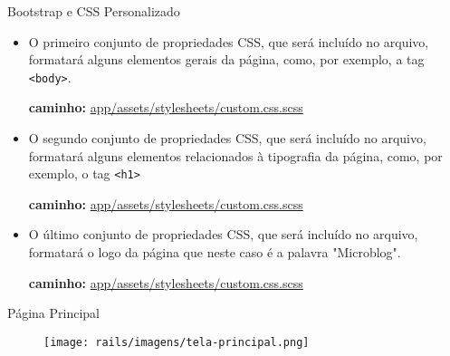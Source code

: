 \begin{frame}{Bootstrap e CSS Personalizado}
\begin{itemize}
      \item O primeiro conjunto de propriedades CSS, que será incluído no arquivo, formatará
        alguns elementos gerais da página, como, por exemplo, a tag \verb!<body>!.
      \begin{exampleblock}{\tiny\textbf{caminho: }\url{app/assets/stylesheets/custom.css.scss}}
        
      \end{exampleblock}
      
      \item O segundo conjunto de propriedades CSS, que será incluído no arquivo, formatará
        alguns elementos relacionados à tipografia da página, como, por exemplo, o tag \verb!<h1>!
      \begin{exampleblock}{\tiny\textbf{caminho: }\url{app/assets/stylesheets/custom.css.scss}}
        
      \end{exampleblock}
      
      \item O último conjunto de propriedades CSS, que será incluído no arquivo, formatará
        o logo da página que neste caso é a palavra "Microblog". 
      \begin{exampleblock}{\tiny\textbf{caminho: }\url{app/assets/stylesheets/custom.css.scss}}
        
      \end{exampleblock}
      
    \end{itemize}
\end{frame} 
\begin{frame}{Página Principal}
       \begin{figure}[h!]
        \centering
        \texttt{[image: rails/imagens/tela-principal.png]}
      \end{figure}
\end{frame}